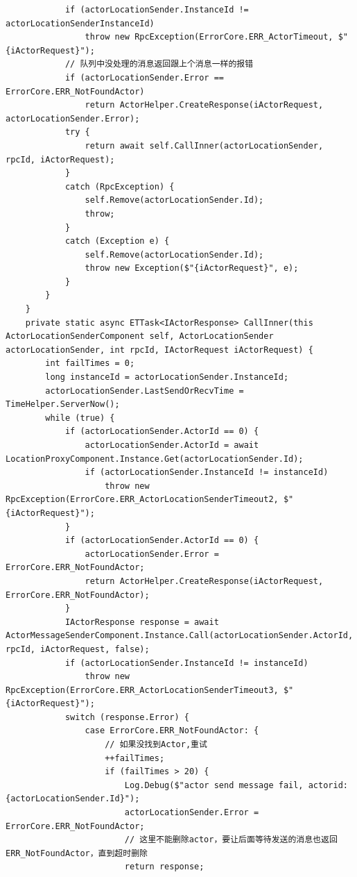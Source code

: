 \documentclass[9pt, b5paper]{article}
\begin{document}
\begin{verbatim}
            if (actorLocationSender.InstanceId != actorLocationSenderInstanceId) 
                throw new RpcException(ErrorCore.ERR_ActorTimeout, $"{iActorRequest}");
            // 队列中没处理的消息返回跟上个消息一样的报错
            if (actorLocationSender.Error == ErrorCore.ERR_NotFoundActor) 
                return ActorHelper.CreateResponse(iActorRequest, actorLocationSender.Error);
            try {
                return await self.CallInner(actorLocationSender, rpcId, iActorRequest);
            }
            catch (RpcException) {
                self.Remove(actorLocationSender.Id);
                throw;
            }
            catch (Exception e) {
                self.Remove(actorLocationSender.Id);
                throw new Exception($"{iActorRequest}", e);
            }
        }
    }
    private static async ETTask<IActorResponse> CallInner(this ActorLocationSenderComponent self, ActorLocationSender actorLocationSender, int rpcId, IActorRequest iActorRequest) {
        int failTimes = 0;
        long instanceId = actorLocationSender.InstanceId;
        actorLocationSender.LastSendOrRecvTime = TimeHelper.ServerNow();
        while (true) {
            if (actorLocationSender.ActorId == 0) {
                actorLocationSender.ActorId = await LocationProxyComponent.Instance.Get(actorLocationSender.Id);
                if (actorLocationSender.InstanceId != instanceId) 
                    throw new RpcException(ErrorCore.ERR_ActorLocationSenderTimeout2, $"{iActorRequest}");
            }
            if (actorLocationSender.ActorId == 0) {
                actorLocationSender.Error = ErrorCore.ERR_NotFoundActor;
                return ActorHelper.CreateResponse(iActorRequest, ErrorCore.ERR_NotFoundActor);
            }
            IActorResponse response = await ActorMessageSenderComponent.Instance.Call(actorLocationSender.ActorId, rpcId, iActorRequest, false);
            if (actorLocationSender.InstanceId != instanceId) 
                throw new RpcException(ErrorCore.ERR_ActorLocationSenderTimeout3, $"{iActorRequest}");
            switch (response.Error) {
                case ErrorCore.ERR_NotFoundActor: {
                    // 如果没找到Actor,重试
                    ++failTimes;
                    if (failTimes > 20) {
                        Log.Debug($"actor send message fail, actorid: {actorLocationSender.Id}");
                        actorLocationSender.Error = ErrorCore.ERR_NotFoundActor;
                        // 这里不能删除actor，要让后面等待发送的消息也返回ERR_NotFoundActor，直到超时删除
                        return response;

\end{verbatim}
\end{document}
